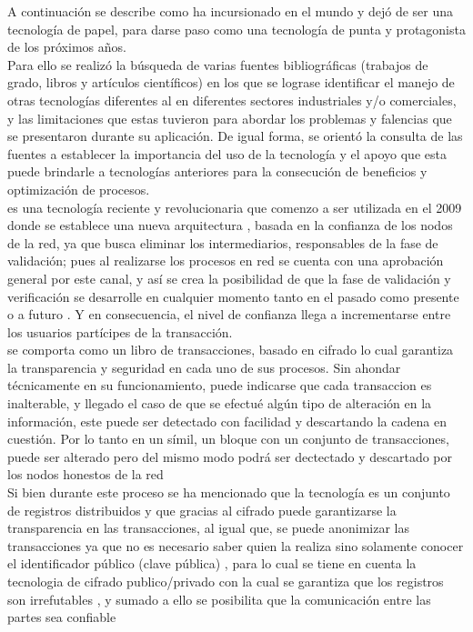 A continuación se describe como \blckchn ha incursionado en el mundo y dejó de ser una tecnología de papel, para darse paso como una tecnología de punta y protagonista de los próximos años.
\\ 
Para ello se realizó la búsqueda de varias fuentes bibliográficas (trabajos de grado, libros y artículos científicos) en los que se lograse identificar el manejo de otras tecnologías diferentes al \blckchn en diferentes sectores industriales y/o comerciales, y las limitaciones que estas tuvieron para abordar los problemas y falencias que se presentaron durante su aplicación. De igual forma, se orientó la consulta de las fuentes a establecer la importancia del uso de la tecnología \blckchn y el apoyo que esta puede brindarle a tecnologías anteriores para la consecución de beneficios y optimización de procesos.
\\
\blckchn es una tecnología reciente y revolucionaria que comenzo a ser utilizada en el 2009 donde se establece una nueva arquitectura \citep{iansiti2017truth}, basada en la confianza de los nodos de la red, ya que busca eliminar los intermediarios, responsables de la fase de validación; pues al realizarse los procesos en red se cuenta con una aprobación general por este canal, y así se crea la posibilidad de que la fase de validación y verificación se desarrolle en cualquier momento tanto en el pasado como presente o a futuro \citep{crosby2016blockchain}. Y en consecuencia, el nivel de confianza llega a incrementarse entre los usuarios partícipes de la transacción. 
\\
\blckchn se comporta como un libro de transacciones, basado en cifrado lo cual garantiza la transparencia y seguridad en cada uno de sus procesos. Sin ahondar técnicamente en su funcionamiento, puede indicarse que cada transaccion es inalterable, y llegado el caso de que se efectué algún tipo de alteración en la información, este puede ser detectado con facilidad y descartando la cadena en cuestión. Por lo tanto en un símil, un bloque con un conjunto de transacciones, puede ser alterado pero del mismo modo podrá ser dectectado y descartado por los nodos honestos de la red \citep{nakamoto2009bitcoin}
\\
Si bien durante este proceso se ha mencionado que la tecnología \blckchn es un conjunto de registros distribuidos y que gracias al cifrado puede garantizarse la transparencia en las transacciones, al igual que, se puede anonimizar las transacciones ya que no es necesario saber quien la realiza sino solamente conocer el identificador público (clave pública) \citep{crosby2016blockchain}, para lo cual se tiene en cuenta la tecnologia de cifrado publico/privado con la cual se garantiza que los registros son irrefutables \citep{banafa2017Blockchain}, y sumado a ello se posibilita que la comunicación entre las partes sea confiable \citep{iansiti2017truth}


